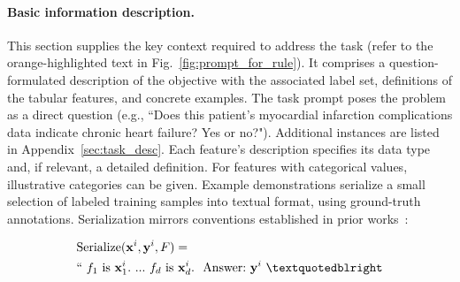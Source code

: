 \vspace*{-0.12in}
\paragraph{Basic information description.} This section supplies the key context required to address the task (refer to the orange-highlighted text in Fig.~\ref{fig:prompt_for_rule}). It comprises a question-formulated description of the objective with the associated label set, definitions of the tabular features, and concrete examples. The task prompt poses the problem as a direct question (e.g., ``Does this patient's myocardial infarction complications data indicate chronic heart failure? Yes or no?"). Additional instances are listed in Appendix~\ref{sec:task_desc}. Each feature's description specifies its data type and, if relevant, a detailed definition. For features with categorical values, illustrative categories can be given. Example demonstrations serialize a small selection of labeled training samples into textual format, using ground-truth annotations. Serialization mirrors conventions established in prior works~\cite{dinh2022lift,hegselmann2023tabllm}:

\begin{align}
&\text{Serialize}(\mathbf{x}^i,\mathbf{y}^i, F) = \nonumber \\ 
&``\ f_1\ \text{is}\ \mathbf{x}^i_1.\ ... \ f_d\  \text{is}\  \mathbf{x}^i_d.\ \ \text{Answer:}\  \mathbf{y}^i\ ”
\end{align}

\vspace*{-0.12in}
